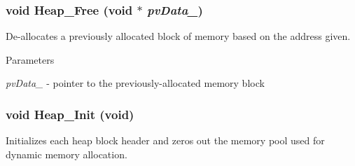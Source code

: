 \subsubsection[{Heap\_\-Free}]{\setlength{\rightskip}{0pt plus 5cm}void Heap\_\-Free (void $\ast$ {\em pvData\_\-})}\label{heap_8c_a26781ec4e59e14d49e5083019a453e1c}
De-\/allocates a previously allocated block of memory based on the address given.


\begin{DoxyParams}{Parameters}
\item[{\em pvData\_\-}]-\/ pointer to the previously-\/allocated memory block \end{DoxyParams}
\subsubsection[{Heap\_\-Init}]{\setlength{\rightskip}{0pt plus 5cm}void Heap\_\-Init (void)}\label{heap_8c_a69bb83782a1700fca779167755464e11}
Initializes each heap block header and zeros out the memory pool used for dynamic memory allocation. 